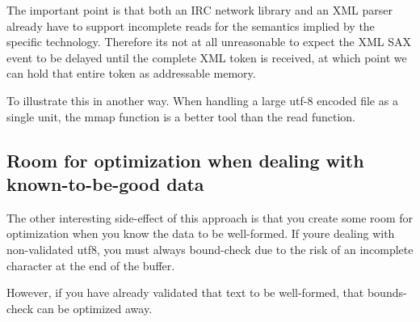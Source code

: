The important point is that both an I\+RC network library and an X\+ML parser already have to support incomplete reads for the semantics implied by the specific technology. Therefore it\textquotesingle{}s not at all unreasonable to expect the X\+ML S\+AX event to be delayed until the complete X\+ML token is received, at which point we can hold that entire token as addressable memory.

To illustrate this in another way. When handling a large utf-\/8 encoded file as a single unit, the {\ttfamily mmap} function is a better tool than the {\ttfamily read} function.

\subsection*{Room for optimization when dealing with known-\/to-\/be-\/good data}

The other interesting side-\/effect of this approach is that you create some room for optimization when you know the data to be well-\/formed. If you\textquotesingle{}re dealing with non-\/validated utf8, you must always bound-\/check due to the risk of an incomplete character at the end of the buffer.

However, if you have already validated that text to be well-\/formed, that bounds-\/check can be optimized away. 